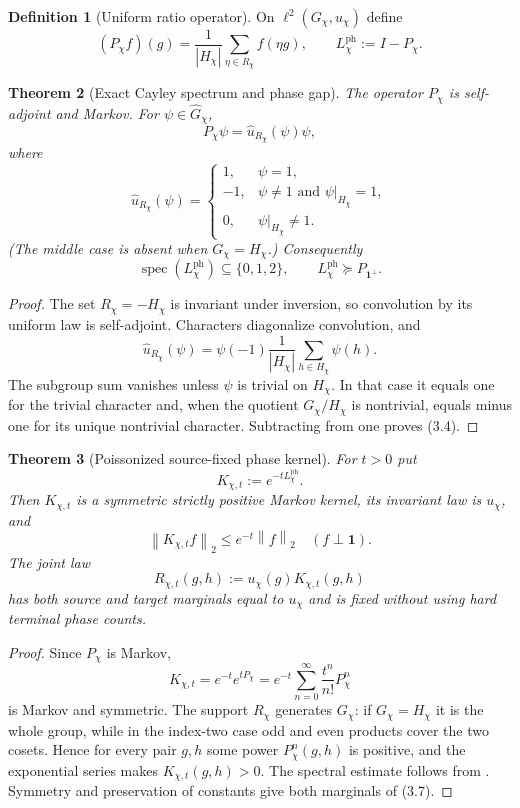 \documentclass[11pt]{article}
\newtheorem{theorem}{Theorem}[section]
\theoremstyle{definition}
\newtheorem{definition}[theorem]{Definition}
\theoremstyle{remark}
\newcommand{\one}{\mathbf 1}
\newcommand{\norm}[1]{\left\lVert#1\right\rVert}
\newcommand{\Phase}{\mathrm{ph}}
\begin{document}
\begin{definition}[Uniform ratio operator]
On $\ell^2(G_\chi,u_\chi)$ define
\[
 (P_\chi f)(g)
 =\frac1{|H_\chi|}\sum_{\eta\in R_\chi}f(\eta g),
 \qquad
 L_\chi^{\Phase}:=I-P_\chi.
 \tag{3.2}
\]
\end{definition}

\begin{theorem}[Exact Cayley spectrum and phase gap]
\label{thm:Cayley-spectrum}
The operator $P_\chi$ is self-adjoint and Markov.  For
$\psi\in\widehat G_\chi$,
\[
 P_\chi\psi=\widehat u_{R_\chi}(\psi)\psi,
\]
where
\[
 \boxed{
 \widehat u_{R_\chi}(\psi)
 =\begin{cases}
 1,&\psi=1,\\
 -1,&\psi\ne1\text{ and }\psi|_{H_\chi}=1,\\
 0,&\psi|_{H_\chi}\ne1.
 \end{cases}}
 \tag{3.3}
\]
(The middle case is absent when $G_\chi=H_\chi$.)  Consequently
\[
 \boxed{\operatorname{spec}(L_\chi^{\Phase})\subseteq\{0,1,2\},
 \qquad
 L_\chi^{\Phase}\succeq P_{\one^\perp}.}
 \tag{3.4}
\]
\end{theorem}

\begin{proof}
The set $R_\chi=-H_\chi$ is invariant under inversion, so convolution by its
uniform law is self-adjoint.  Characters diagonalize convolution, and
\[
 \widehat u_{R_\chi}(\psi)
 =\psi(-1)\frac1{|H_\chi|}\sum_{h\in H_\chi}\psi(h).
\]
The subgroup sum vanishes unless $\psi$ is trivial on $H_\chi$.  In that
case it equals one for the trivial character and, when the quotient
$G_\chi/H_\chi$ is nontrivial, equals minus one for its unique nontrivial
character.  Subtracting from one proves \textup{(3.4)}.
\end{proof}

\begin{theorem}[Poissonized source-fixed phase kernel]
\label{thm:Poissonized-phase-kernel}
For $t>0$ put
\[
 K_{\chi,t}:=e^{-tL_\chi^{\Phase}}.
 \tag{3.5}
\]
Then $K_{\chi,t}$ is a symmetric strictly positive Markov kernel, its invariant
law is $u_\chi$, and
\[
 \boxed{
 \norm{K_{\chi,t}f}_2\le e^{-t}\norm f_2
 \quad(f\perp\one).}
 \tag{3.6}
\]
The joint law
\[
 \boxed{
 R_{\chi,t}(g,h):=u_\chi(g)K_{\chi,t}(g,h)}
 \tag{3.7}
\]
has both source and target marginals equal to $u_\chi$ and is fixed without
using hard terminal phase counts.
\end{theorem}

\begin{proof}
Since $P_\chi$ is Markov,
\[
 K_{\chi,t}
 =e^{-t}e^{tP_\chi}
 =e^{-t}\sum_{n=0}^\infty\frac{t^n}{n!}P_\chi^n
\]
is Markov and symmetric.  The support $R_\chi$ generates $G_\chi$: if
$G_\chi=H_\chi$ it is the whole group, while in the index-two case odd and
even products cover the two cosets.  Hence for every pair $g,h$ some power
$P_\chi^n(g,h)$ is positive, and the exponential series makes
$K_{\chi,t}(g,h)>0$.  The spectral estimate follows from
.  Symmetry and preservation of constants give both
marginals of \textup{(3.7)}.
\end{proof}
\end{document}
